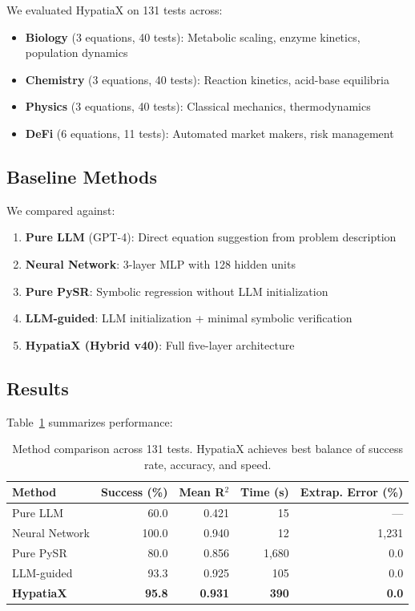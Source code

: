 \documentclass[twoside,11pt]{article}
\begin{document}
We evaluated HypatiaX on 131 tests across:

\begin{itemize}
\item \textbf{Biology} (3 equations, 40 tests): Metabolic scaling, enzyme kinetics, population dynamics
\item \textbf{Chemistry} (3 equations, 40 tests): Reaction kinetics, acid-base equilibria
\item \textbf{Physics} (3 equations, 40 tests): Classical mechanics, thermodynamics
\item \textbf{DeFi} (6 equations, 11 tests): Automated market makers, risk management
\end{itemize}

\subsection{Baseline Methods}

We compared against:

\begin{enumerate}
\item \textbf{Pure LLM} (GPT-4): Direct equation suggestion from problem description
\item \textbf{Neural Network}: 3-layer MLP with 128 hidden units
\item \textbf{Pure PySR}: Symbolic regression without LLM initialization
\item \textbf{LLM-guided}: LLM initialization + minimal symbolic verification
\item \textbf{HypatiaX (Hybrid v40)}: Full five-layer architecture
\end{enumerate}

\subsection{Results}

Table~\ref{tab:methods} summarizes performance:

\begin{table}[t]
\centering
\caption{Method comparison across 131 tests. HypatiaX achieves best balance of success rate, accuracy, and speed.}
\label{tab:methods}
\begin{tabular}{lrrrr}
\toprule
Method & Success (\%) & Mean R$^2$ & Time (s) & Extrap. Error (\%) \\
\midrule
Pure LLM & 60.0 & 0.421 & 15 & --- \\
Neural Network & 100.0 & 0.940 & 12 & 1,231 \\
Pure PySR & 80.0 & 0.856 & 1,680 & 0.0 \\
LLM-guided & 93.3 & 0.925 & 105 & 0.0 \\
\textbf{HypatiaX} & \textbf{95.8} & \textbf{0.931} & \textbf{390} & \textbf{0.0} \\
\bottomrule
\end{tabular}
\end{table}
\end{document}
